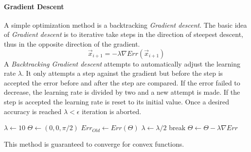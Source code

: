 \documentclass[Master]{subfiles}
\begin{document}
\paragraph{Gradient Descent}\label{num:GD}
A simple optimization method is a backtracking \textit{Gradient descent}.
The basic idea of \textit{Gradient descent} is to iterative take steps in the direction of steepest descent, thus in the opposite direction of the gradient.
$$ \vec{x}_{i+1}= -\lambda \nabla Err(\vec{x}_{i+1})$$
A \textit{Backtracking Gradient descent} attempts to automatically adjust the learning rate $\lambda$.
It only attempts a step against the gradient but before the step is accepted the error before and after the step are compared. If the error failed to decrease, the learning rate is divided by two and a new attempt is made. If the step is accepted the learning rate is reset to its initial value. Once a desired accuracy is reached $\lambda < \epsilon$ iteration is aborted.
\begin{algorithm}
\caption{Back stepping Gradient Descent}\label{FGradDescent}
\begin{algorithmic}[1]
\Procedure{}{}
\State $\lambda \gets 10$
\State  $\Theta \gets (0,0,\pi/2)$
\Loop
\State $Err_{Old} \gets Err(\Theta)$
\State $\lambda \gets \lambda/2$
\If {$\lambda < \epsilon$}
\State break
\EndIf
\EndWhile
\State $\Theta \gets \Theta - \lambda \nabla Err$
\EndLoop
\EndProcedure
\end{algorithmic}
\end{algorithm}
This method is guaranteed to converge for convex functions.
\end{document}
